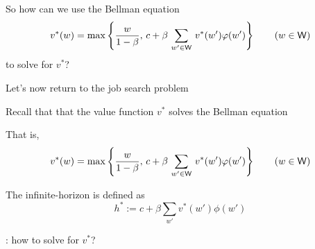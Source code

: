\begin{frame}

    So how can we use the Bellman equation
    \begin{equation*}
        v^*(w) = 
        \max \left\{
            \frac{w}{1-\beta}
            ,\,
            c + \beta \, \sum_{w' \in \mathsf W} \, v^*(w') \varphi(w')
            \right\}
            \qquad (w \in \mathsf W)
    \end{equation*}
    to solve for $v^*$?


\end{frame}






\begin{frame}

    Let's now return to the job search problem 

    Recall that that the value function $v^*$ solves the Bellman equation

    \vspace{1em}

    That is,
    \begin{equation*}
        v^*(w) = 
        \max \left\{
            \frac{w}{1-\beta}
            ,\,
            c + \beta \, \sum_{w' \in \mathsf W} \, v^*(w') \varphi(w')
            \right\}
            \qquad (w \in \mathsf W)
    \end{equation*}

    \vspace{1em}

    The infinite-horizon  is defined as
    \begin{equation*}
        h^* := c + \beta \sum_{w'} v^*(w') \phi(w') 
    \end{equation*}

    : how to solve for $v^*$?  

\end{frame}


